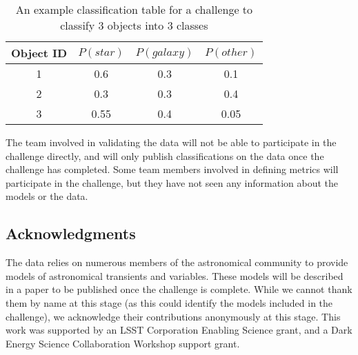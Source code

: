 \documentclass[\docopts]{\docclass}
\begin{document}
\begin{table}[htbp!]
\begin{center}
\begin{tabular}{|c|c|c|c|}
Object ID & $P(star)$ & $P(galaxy)$ & $P(other)$ \\
\hline
1 & 0.6 & 0.3 & 0.1\\
2 & 0.3 & 0.3 & 0.4\\
3 & 0.55 & 0.4 & 0.05\\
\end{tabular}
\caption{An example classification table for a challenge to classify 3 objects into 3 classes}
\end{center}
\end{table}

The {\plasticc} team involved in validating the data will not be able to participate in the challenge directly, and will only publish classifications on the data once the challenge has completed. Some {\plasticc} team members involved in defining metrics will participate in the challenge, but they have not seen any {\plasticc} information about the models or the data.


\subsection{Acknowledgments}
The {\plasticc} data relies on numerous members of the astronomical community to provide models of astronomical transients and variables. These models will be described in a paper to be published once the challenge is complete. While we cannot thank them by name at this stage (as this could identify the models included in the challenge), we acknowledge their contributions anonymously at this stage. This work was supported by an LSST Corporation Enabling Science grant, and a Dark Energy Science Collaboration Workshop support grant.



\end{document}
